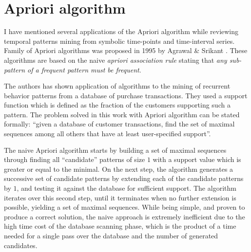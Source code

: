 \section{Apriori algorithm}\label{apriori}
I have mentioned several applications of the Apriori algorithm while reviewing temporal patterns mining from symbolic time-points and time-interval series. Family of Apriori algorithms was proposed in 1995 by Agrawal \& Srikant \cite{citeulike:775528}. These algorithms are based on the naive \textit{apriori association rule} stating that \textit{any sub-pattern of a frequent pattern must be frequent}. 

The authors has shown application of algorithms to the mining of recurrent behavior patterns from a database of purchase transactions. They used a support function which is defined as the fraction of the customers supporting such a pattern. The problem solved in this work with Apriori algorithm can be stated formally: ``given a database of customer transactions, find the set of maximal sequences among all others that have at least user-specified support''.

The naive Apriori algorithm starts by building a set of maximal sequences through finding all ``candidate'' patterns of size $1$ with a support value which is greater or equal to the minimal. On the next step, the algorithm generates a successive set of candidate patterns by extending each of the candidate patterns by $1$, and testing it against the database for sufficient support. The algorithm iterates over this second step, until it terminates when no further extension is possible, yielding a set of maximal sequences. While being simple, and proven to produce a correct solution, the naive approach is extremely inefficient due to the high time cost of the database scanning phase, which is the product of a time needed for a single pass over the database and the number of generated candidates.

